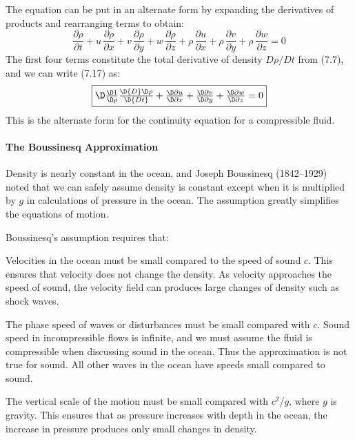 The equation can be put in an alternate form by expanding the
derivatives of products and rearranging terms to obtain:
\begin{displaymath}
\frac{\partial{\rho}}{\partial{t}} + u\,\frac{\partial{\rho}}{\partial{x}} + v\,\frac{\partial{\rho}}{\partial{y}} + w\,\frac{\partial{\rho}}{\partial{z}} +
\rho\,\frac{\partial{u}}{\partial{x}} + \rho\,\frac{\partial{v}}{\partial{y}} + \rho\,\frac{\partial{w}}{\partial{z}} = 0
\end{displaymath}
The first four terms constitute the total derivative of density
$D\rho/Dt$ from (7.7), and we can write (7.17) as:
\begin{equation}
\fbox{$\D
\frac{\D1}{\D\rho}\frac{\D{D}\D\rho}{\D{Dt}} + \frac{\D\partial{u}}{\D\partial{x}} + \frac{\D\partial{v}}{\D\partial{y}} + \frac{\D\partial{w}}{\D\partial{z}} =
0
$}\end{equation}
This is the alternate form for the continuity equation for a
compressible fluid.

\paragraph{The Boussinesq Approximation}
Density is nearly constant in the
ocean, and Joseph Boussinesq (1842--1929) noted that we can safely
assume density is constant except when it is multiplied by $g$ in
calculations of pressure in the ocean. The assumption greatly
simplifies the equations of motion.

Boussinesq's assumption requires that:
\begin{enumerate}
\vitem Velocities in the ocean must be small compared to the speed of
sound $c$. This
ensures that velocity does not change the density. As velocity
approaches the speed of sound, the velocity field can produces large
changes of density such as shock waves.

\vitem The phase speed of waves or disturbances must be small compared
with $c$.  Sound speed in
incompressible flows is infinite, and we must assume the fluid is
compressible when discussing sound in the ocean. Thus the
approximation is not true for sound. All other waves in the ocean have
speeds small compared to sound.

\vitem The vertical scale of the motion must be small compared with
$c^2$/$g$, where $g$ is gravity. This ensures that as pressure
increases with depth in the ocean, the increase in pressure produces
only small changes in density.
\end{enumerate}

